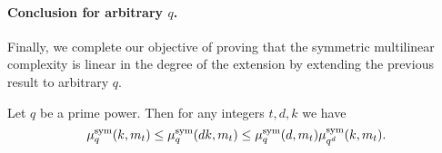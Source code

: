 \paragraph{Conclusion for arbitrary $q$.}
Finally, we complete our objective of proving that the symmetric multilinear
complexity is linear in the degree of the extension by extending the previous
result to arbitrary $q$.

%

\begin{lm}
\label{lemma:basechange}
Let $q$ be a prime power. Then for any integers $t,d,k$ we have
\[ \mu^{\textrm{sym}}_q(k,m_t)\leq\mu^{\textrm{sym}}_q(dk,m_t)\leq\mu^{\textrm{sym}}_q(d,m_t)\mu^{\textrm{sym}}_{q^d}(k,m_t). \]
\end{lm}
